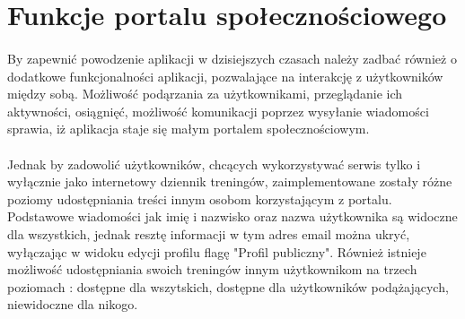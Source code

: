 \section{Funkcje portalu społecznościowego} %
\label{sec:profil_u_ytkownika}
\paragraph{} %
\label{par:}
By zapewnić powodzenie aplikacji w dzisiejszych czasach należy zadbać również o dodatkowe funkcjonalności aplikacji, pozwalające na interakcję z użytkowników między sobą. Możliwość podąrzania za użytkownikami, przeglądanie ich aktywności, osiągnięć, możliwość komunikacji poprzez wysyłanie wiadomości sprawia, iż aplikacja staje się małym portalem społecznościowym. 
\paragraph{} %
\label{par:}

Jednak by zadowolić użytkowników, chcących wykorzystywać serwis tylko i wyłącznie jako internetowy dziennik treningów, zaimplementowane zostały różne poziomy udostępniania treści innym osobom korzystającym z portalu. Podstawowe wiadomości jak imię i nazwisko oraz nazwa użytkownika są widoczne dla wszystkich, jednak resztę informacji w tym adres email można ukryć, wyłączając w widoku edycji profilu flagę "Profil publiczny". Również istnieje możliwość udostępniania swoich treningów innym użytkownikom na trzech poziomach : dostępne dla wszytskich, dostępne dla użytkowników podążających, niewidoczne dla nikogo.


